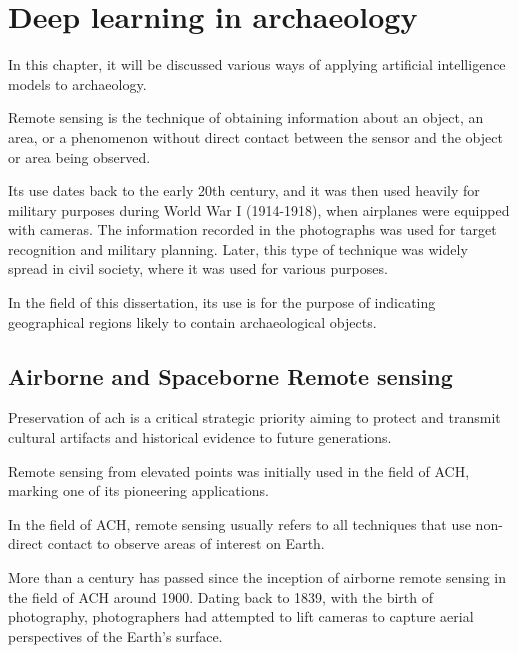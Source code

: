 

\chapter{Deep learning in archaeology}

\begin{introduction}
In this chapter, it will be discussed various ways of applying artificial intelligence models to archaeology.
\end{introduction}
Remote sensing is the technique of obtaining information about an object, an area, or a phenomenon without direct contact between the sensor and the object or area being observed.

Its use dates back to the early 20th century\cite{asmr}, and it was then used heavily for military purposes during World War I (1914-1918)\cite{war1}, when airplanes were equipped with cameras. The information recorded in the photographs was used for target recognition and military planning.
Later, this type of technique was widely spread in civil society, where it was used for various purposes. 

In the field of this dissertation, its use is for the purpose of indicating geographical regions likely to contain archaeological objects.



\section{Airborne and Spaceborne Remote sensing}

Preservation of \ac{ach} is a critical strategic priority aiming to protect and transmit cultural artifacts and historical evidence to future generations.

Remote sensing from elevated points was initially used in the field of ACH\cite{asmr}, marking one of its pioneering applications.

In the field of ACH, remote sensing usually refers to all techniques that use non-direct contact to observe areas of interest on Earth.

More than a century has passed since the inception of airborne remote sensing in the field of ACH around 1900. Dating back to 1839, with the birth of photography, photographers had attempted to lift cameras to capture aerial perspectives of the Earth's surface.

